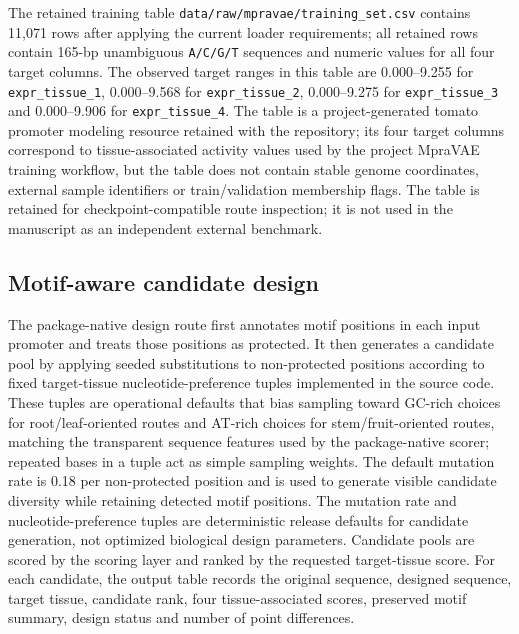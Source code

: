 \documentclass[10pt]{article}
\begin{document}
The retained training table \texttt{data/raw/mpravae/training\_set.csv} contains 11,071 rows after applying the current loader requirements; all retained rows contain 165-bp unambiguous \texttt{A/C/G/T} sequences and numeric values for all four target columns. The observed target ranges in this table are 0.000--9.255 for \texttt{expr\_tissue\_1}, 0.000--9.568 for \texttt{expr\_tissue\_2}, 0.000--9.275 for \texttt{expr\_tissue\_3} and 0.000--9.906 for \texttt{expr\_tissue\_4}. The table is a project-generated tomato promoter modeling resource retained with the repository; its four target columns correspond to tissue-associated activity values used by the project MpraVAE training workflow, but the table does not contain stable genome coordinates, external sample identifiers or train/validation membership flags. The table is retained for checkpoint-compatible route inspection; it is not used in the manuscript as an independent external benchmark.

\subsection{Motif-aware candidate design}

The package-native design route first annotates motif positions in each input promoter and treats those positions as protected. It then generates a candidate pool by applying seeded substitutions to non-protected positions according to fixed target-tissue nucleotide-preference tuples implemented in the source code. These tuples are operational defaults that bias sampling toward GC-rich choices for root/leaf-oriented routes and AT-rich choices for stem/fruit-oriented routes, matching the transparent sequence features used by the package-native scorer; repeated bases in a tuple act as simple sampling weights. The default mutation rate is 0.18 per non-protected position and is used to generate visible candidate diversity while retaining detected motif positions. The mutation rate and nucleotide-preference tuples are deterministic release defaults for candidate generation, not optimized biological design parameters. Candidate pools are scored by the scoring layer and ranked by the requested target-tissue score. For each candidate, the output table records the original sequence, designed sequence, target tissue, candidate rank, four tissue-associated scores, preserved motif summary, design status and number of point differences.
\end{document}
